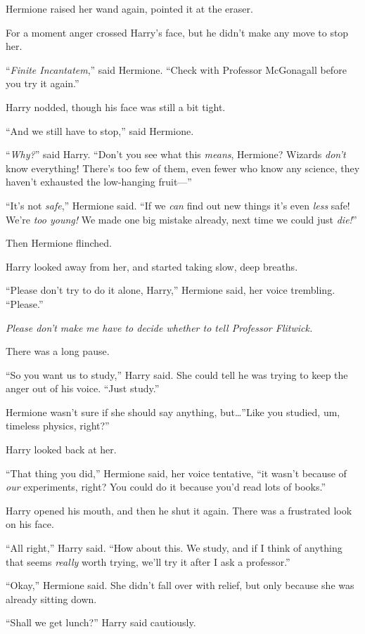 Hermione raised her wand again, pointed it at the eraser.

For a moment anger crossed Harry’s face, but he didn’t make any move to stop her.

“\emph{Finite Incantatem},” said Hermione. “Check with Professor McGonagall before you try it again.”

Harry nodded, though his face was still a bit tight.

“And we still have to stop,” said Hermione.

“\emph{Why?}” said Harry. “Don’t you see what this \emph{means}, Hermione? Wizards \emph{don’t} know everything! There’s too few of them, even fewer who know any science, they haven’t exhausted the low-hanging fruit—”

“It’s not \emph{safe},” Hermione said. “If we \emph{can} find out new things it’s even \emph{less} safe! We’re \emph{too young!} We made one big mistake already, next time we could just \emph{die!}”

Then Hermione flinched.

Harry looked away from her, and started taking slow, deep breaths.

“Please don’t try to do it alone, Harry,” Hermione said, her voice trembling. “Please.”

\emph{Please don’t make me have to decide whether to tell Professor Flitwick.}

There was a long pause.

“So you want us to study,” Harry said. She could tell he was trying to keep the anger out of his voice. “Just study.”

Hermione wasn’t sure if she should say anything, but…”Like you studied, um, timeless physics, right?”

Harry looked back at her.

“That thing you did,” Hermione said, her voice tentative, “it wasn’t because of \emph{our} experiments, right? You could do it because you’d read lots of books.”

Harry opened his mouth, and then he shut it again. There was a frustrated look on his face.

“All right,” Harry said. “How about this. We study, and if I think of anything that seems \emph{really} worth trying, we’ll try it after I ask a professor.”

“Okay,” Hermione said. She didn’t fall over with relief, but only because she was already sitting down.

“Shall we get lunch?” Harry said cautiously.

